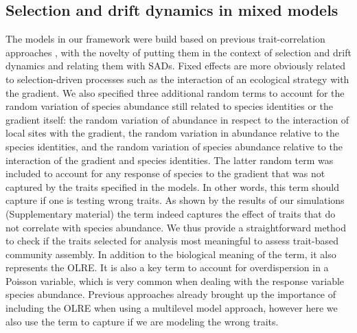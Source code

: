 \documentclass[12pt]{article}
\begin{document}

\subsection*{Selection and drift dynamics in mixed models }

The models in our framework were build based on previous trait-correlation approaches \citep{Pollock2012, Jamil2013, Jamil2013a, Miller2019, TerBraak2019}, with the novelty of putting them in the context of selection and drift dynamics and relating them with SADs. Fixed effects are more obviously related to selection-driven processes such as the interaction of an ecological strategy with the gradient. We also specified three additional random terms to account for the random variation of species abundance still related to species identities or the gradient itself: the random variation of abundance in respect to the interaction of local sites with the gradient, the random variation in abundance relative to the species identities, and the random variation of species abundance relative to the interaction of the gradient and species identities. The latter random term  was included to account for any response of species to the gradient that was not captured by the traits specified in the models. In other words, this term should capture if one is testing wrong traits. As shown by the results of our simulations (Supplementary material) the term indeed captures the effect of traits that do not correlate with species abundance.
We thus provide a straightforward method to check if the traits selected for analysis most meaningful to assess trait-based community assembly. In addition to the biological meaning of the term, it also represents the OLRE.
It is also a key term to account for overdispersion in a Poisson variable, which is very common when dealing with the response variable species abundance. Previous approaches \citep{Miller2019, TerBraak2019} already brought up the importance of including the OLRE when using a multilevel model approach, however here we also use the term to capture if we are modeling the wrong traits. 
\end{document}
